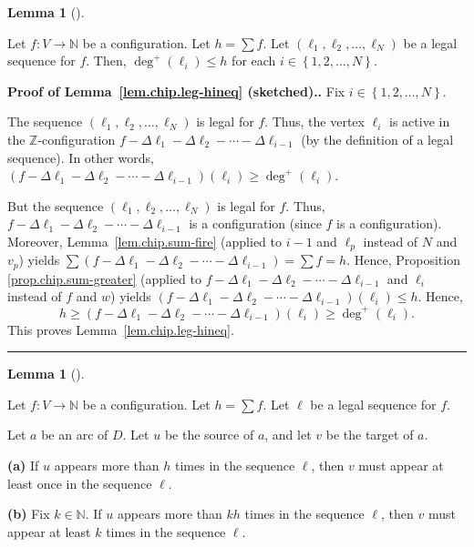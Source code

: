 \documentclass[numbers=enddot,12pt,final,onecolumn,notitlepage]{scrartcl}%
\theoremstyle{definition}
\newtheorem{lem}[theo]{Lemma}
\newenvironment{lemma}[1][]
{\begin{lem}[#1]\begin{leftbar}}
{\end{leftbar}\end{lem}}
\newenvironment{proof}[1][Proof]{\noindent\textbf{#1.} }{\ \rule{0.5em}{0.5em}}
\let\sumnonlimits\sum
\renewcommand{\sum}{\sumnonlimits\limits}
\newcommand{\NN}{\mathbb{N}}
\newcommand{\ZZ}{\mathbb{Z}}
\newcommand{\set}[1]{\left\{ #1 \right\}}
\newcommand{\tup}[1]{\left( #1 \right)}
\begin{document}
\begin{lemma} \label{lem.chip.leg-hineq}
Let $f : V \to \NN$ be a configuration.
Let $h = \sum f$.
Let $\tup{\ell_1, \ell_2, \ldots, \ell_N}$ be a legal sequence for $f$.
Then, $\deg^+ \tup{\ell_i} \leq h$ for each
$i \in \set{1, 2, \ldots, N}$.
\end{lemma}

\begin{proof}[Proof of Lemma~\ref{lem.chip.leg-hineq} (sketched).]
Fix $i\in\left\{  1,2,\ldots,N\right\}  $.

The sequence $\left(  \ell_{1},\ell_{2},\ldots,\ell_{N}\right)  $ is legal for
$f$. Thus, the vertex $\ell_{i}$ is active in the $\ZZ$-configuration
$f-\Delta\ell_{1}-\Delta\ell_{2}-\cdots-\Delta\ell_{i-1}$ (by the definition
of a legal sequence). In other words, $\left(  f-\Delta\ell_{1}-\Delta\ell
_{2}-\cdots-\Delta\ell_{i-1}\right)  \left(  \ell_{i}\right)  \geq\deg
^{+}\left(  \ell_{i}\right)  $.

But the sequence $\left(  \ell_{1},\ell_{2},\ldots,\ell_{N}\right)  $ is legal
for $f$. Thus, $f-\Delta\ell_{1}-\Delta\ell_{2}-\cdots-\Delta\ell_{i-1}$ is a
configuration (since $f$ is a configuration). Moreover,
Lemma~\ref{lem.chip.sum-fire} (applied to $i-1$ and $\ell_p$
instead of $N$ and $v_p$) yields
$\sum\left(  f-\Delta\ell_{1}-\Delta\ell_{2}-\cdots-\Delta\ell_{i-1}\right)
= \sum f =h$.
Hence, Proposition \ref{prop.chip.sum-greater} (applied to $f-\Delta\ell
_{1}-\Delta\ell_{2}-\cdots-\Delta\ell_{i-1}$ and $\ell_i$ instead of $f$ and $w$)
yields $\left(  f-\Delta\ell_{1}-\Delta\ell_{2}-\cdots-\Delta\ell
_{i-1}\right)  \left( \ell_i \right)  \leq h$. Hence,%
\[
h\geq\left(  f-\Delta\ell_{1}-\Delta\ell_{2}-\cdots-\Delta\ell_{i-1}\right)
\tup{ \ell_i }
\geq\deg^{+}\left(  \ell_{i}\right)  .
\]
This proves Lemma~\ref{lem.chip.leg-hineq}.
\end{proof}

\begin{lemma} \label{lem.chip.leg-bound1}
Let $f : V \to \NN$ be a configuration.
Let $h = \sum f$.
Let $\ell$ be a legal sequence for $f$.

Let $a$ be an arc of $D$.
Let $u$ be the source of $a$, and let $v$ be the target of $a$.

\textbf{(a)}
If $u$ appears more than $h$ times in the sequence $\ell$,
then $v$ must appear at least once in the sequence $\ell$.

\textbf{(b)}
Fix $k \in \NN$.
If $u$ appears more than $kh$ times in the sequence $\ell$,
then $v$ must appear at least $k$ times in the sequence $\ell$.
\end{lemma}
\end{document}
